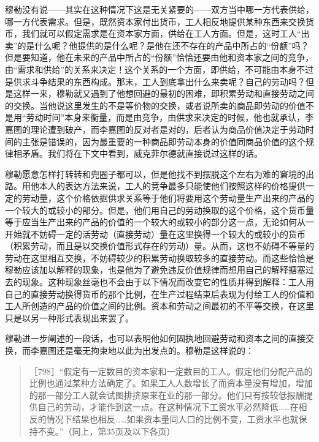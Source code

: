 穆勒没有说——其实在这种情况下这是无关紧要的——双方当中哪一方代表供给，哪一方代表需求。但是，既然资本家付出货币，工人相反地提供某种东西来交换货币，我们就可以假定需求是在资本家方面，供给在工人方面。但是，这时工人“出卖”的是什么呢？他提供的是什么呢？是他在还不存在的产品中所占的“份额”吗？但是要知道，他在未来的产品中所占的“份额”恰恰还要由他和资本家之间的竞争，由“需求和供给”的关系来决定！这个关系的一个方面，即供给，不可能由本身不过是供求斗争结果的东西构成。那末，工人到底拿出什么来卖呢？自己的劳动吗？但是这样一来，穆勒就又遇到了他想回避的最初的困难，即积累劳动和直接劳动之间的交换。当他说这里发生的不是等价物的交换，或者说所卖的商品即劳动的价值不是用“劳动时间”本身来衡量，而是由竞争，由供求来决定的时候，他也就承认，李嘉图的理论遭到破产，而李嘉图的反对者是对的，后者认为商品价值决定于劳动时间的主张是错误的，因为最重要的一种商品即劳动本身的价值同商品价值的这个规律相矛盾。我们将在下文中看到，威克菲尔德就直接说过这样的话。

穆勒愿意怎样打转转和兜圈子都可以，但是他找不到摆脱这个左右为难的窘境的出路。用他本人的表达方法来说，工人的竞争最多只能使他们按照这样的价格提供一定的劳动量，这个价格依据供求关系等于他们将要用这个劳动量生产出来的产品的一个较大的或较小的部分。但是，他们用自己的劳动换取的这个价格，这个货币量等于应当生产出来的产品的价值的一个较大的或较小的部分这一点，无论如何从一开始就不妨碍一定的活劳动（直接劳动）量在这里换得一个较大的或较小的货币（积累劳动，而且是以交换价值形式存在的劳动）量。从而，这也不妨碍不等量的劳动在这里相互交换，不妨碍较少的积累劳动换取较多的直接劳动。而这些恰恰是穆勒应该加以解释的现象，也是他为了避免违反价值规律而想用自己的解释搪塞过去的现象。这种现象丝毫也不会由于以下情况而改变它的性质并得到解释：工人用自己的直接劳动换得货币的那个比例，在生产过程结束后表现为付给工人的价值和工人所创造的产品的价值之间的比例。资本和劳动之间最初的不平等交换，在这里只是以另一种形式表现出来罢了。

穆勒进一步阐述的一段话，也可以表明他如何固执地回避劳动和资本之间的直接交换，而李嘉图还是毫无拘束地以此为出发点的。穆勒是这样说的：

\begin{quote}{［798］“假定有一定数目的资本家和一定数目的工人。假定他们分配产品的比例也通过某种方法确定了。如果工人人数增长了而资本量没有增加，增加的那一部分工人就会试图排挤原来在业的那一部分。他们只有按较低报酬提供自己的劳动，才能作到这一点。在这种情况下工资水平必然降低……在相反的情况下结果也相反……如果资本量同人口的比例不变，工资水平也就保持不变。”（同上，第35页及以下各页）}\end{quote}

